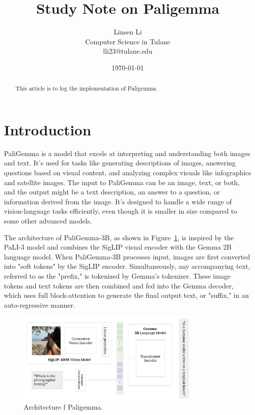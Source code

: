 \documentclass{article}
\title{Study Note on Paligemma} %
\author{
Linsen Li\\
Computer Science in Tulane\\
lli23@tulane.edu
}
\date{\today}
\begin{document}
\maketitle
\begin{abstract}
This article is to log the implementation of Paligemma\cite{beyer2024paligemma}. 
\end{abstract}

\section{Introduction}
PaliGemma\cite{beyer2024paligemma} is a model that excels at interpreting and understanding both images and text. 
It's used for tasks like generating descriptions of images, answering questions based on visual content, 
and analyzing complex visuals like infographics and satellite images. The input to PaliGemma can be an 
image, text, or both, and the output might be a text description, an answer to a question, or information derived 
from the image. It's designed to handle a wide range of vision-language tasks efficiently, 
even though it is smaller in size compared to some other advanced models.

The architecture of PaliGemma-3B, as shown in Figure~\ref{fig:paligemma}, is inspired by the PaLI-3 model and combines the SigLIP visual encoder with the 
Gemma 2B language model. When PaliGemma-3B processes input, images are first converted into "soft tokens" by the SigLIP encoder. 
Simultaneously, any accompanying text, referred to as the "prefix," is tokenized by Gemma's tokenizer. 
These image tokens and text tokens are then combined and fed into the Gemma decoder, which uses full block-attention to generate 
the final output text, or "suffix," in an auto-regressive manner. 

\begin{figure}[htbp]
    \centering
    \includegraphics[width=0.8\textwidth]{figures/paligemma.png}
    \caption{Architecture f Paligemma.}
    \label{fig:paligemma}
\end{figure}
\end{document}
